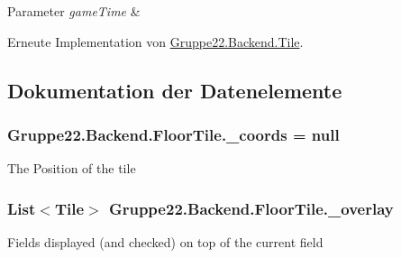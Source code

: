 \begin{DoxyParams}{Parameter}
{\em game\-Time} & \\
\hline
\end{DoxyParams}


Erneute Implementation von \hyperlink{class_gruppe22_1_1_backend_1_1_tile_a0810154a52f859e852497e3717998e47}{Gruppe22.\-Backend.\-Tile}.



\subsection{Dokumentation der Datenelemente}
\hypertarget{class_gruppe22_1_1_backend_1_1_floor_tile_a192eaa6b557b27ddebe7a16ea38d13e5}{
\subsubsection[{\-\_\-coords}]{ Gruppe22.\-Backend.\-Floor\-Tile.\-\_\-coords = null\hspace{0.3cm}{\ttfamily [protected]}}}\label{class_gruppe22_1_1_backend_1_1_floor_tile_a192eaa6b557b27ddebe7a16ea38d13e5}


The Position of the tile 

\hypertarget{class_gruppe22_1_1_backend_1_1_floor_tile_ac860f59975d901d76d45681acf9d61f4}{
\subsubsection[{\-\_\-overlay}]{\setlength{\rightskip}{0pt plus 5cm}List$<${\bf Tile}$>$ Gruppe22.\-Backend.\-Floor\-Tile.\-\_\-overlay\hspace{0.3cm}{\ttfamily [protected]}}}\label{class_gruppe22_1_1_backend_1_1_floor_tile_ac860f59975d901d76d45681acf9d61f4}


Fields displayed (and checked) on top of the current field 



